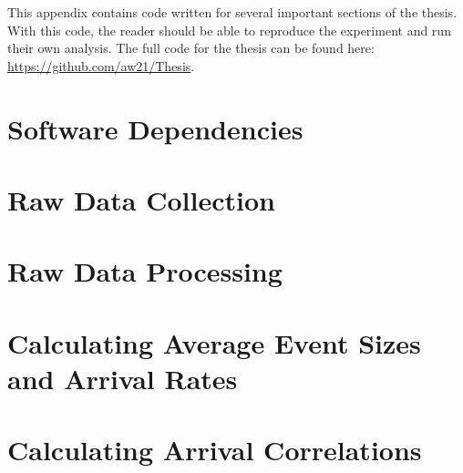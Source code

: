 This appendix contains code written for several important sections of the thesis. With this code, the reader should be able to reproduce the experiment and run their own analysis. The full code for the thesis can be found here: \url{https://github.com/aw21/Thesis}.

\section{Software Dependencies}
\begin{singlespacing}

\end{singlespacing}

\section{Raw Data Collection}
\begin{singlespacing}
\label{data-collection-code}
\end{singlespacing}

\section{Raw Data Processing}
\begin{singlespacing}
\label{data-processing-code}
\end{singlespacing}

\section{Calculating Average Event Sizes and Arrival Rates}
\begin{singlespacing}
\label{AES_and_rate_code}
\end{singlespacing}

\section{Calculating Arrival Correlations}
\begin{singlespacing}
\label{correlation-code}
\end{singlespacing}

